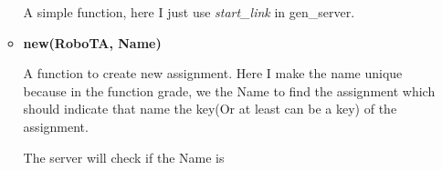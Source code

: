 \documentclass[11pt]{article}
\begin{document}
\begin{enumerate}
\begin{itemize}
A simple function, here I just use \textit{start\_link} in gen\_server.

\item \textbf{new(RoboTA, Name)}

A function to create new assignment. Here I make the name unique because in the function grade, we the Name to find the assignment which should indicate that name the key(Or at least can be a key) of the assignment. 

The server will check if the Name is 
\end{itemize}

\end{enumerate}
\end{document}
